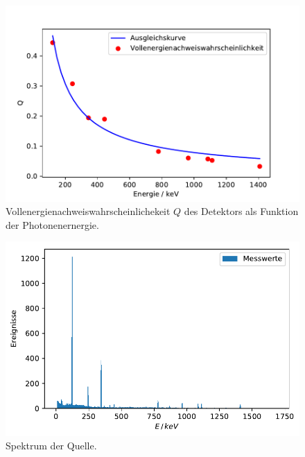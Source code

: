\begin{figure}[H]
   \centering
   \includegraphics[width = .7\textwidth]{../Plots/Effizienz.pdf}
   \caption{Vollenergienachweiswahrscheinlichekeit $Q$ des Detektors als Funktion der Photonenernergie.}
   \label{fig:Vollenergienachweiswahrscheinlichekeit}
\end{figure}

\begin{figure}[H]
  \centering
  \includegraphics[width=.9\textwidth]{../Plots/Eu_Spektrum.pdf}
  \caption{Spektrum der  Quelle.}
  \label{fig:Eu_Spektrum}
\end{figure}

